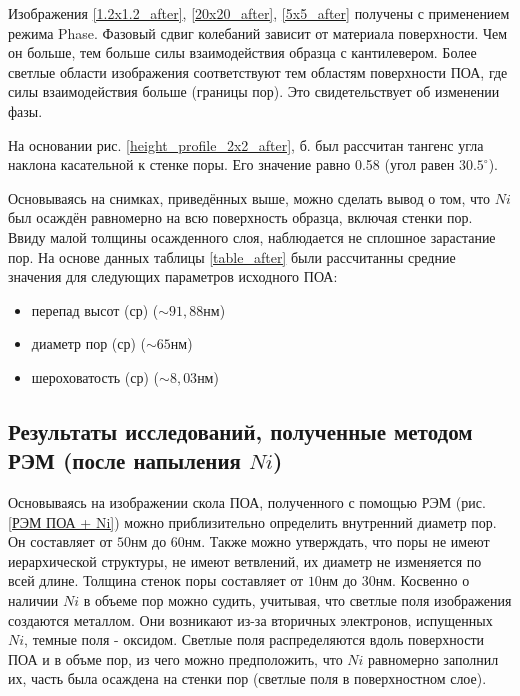 Изображения \ref{1.2x1.2_after}, \ref{20x20_after}, \ref{5x5_after} получены с применением режима Phase. Фазовый сдвиг колебаний зависит от материала поверхности. Чем он больше, тем больше силы взаимодействия образца с кантилевером. Более светлые области изображения соответствуют тем областям поверхности ПОА, где силы взаимодействия больше (границы пор). Это свидетельствует об изменении фазы.

На основании рис. \ref{height_profile_2x2_after}, б. был рассчитан тангенс угла наклона касательной к стенке поры. Его значение равно 0.58 (угол равен $30.5^{\circ}$).

Основываясь на снимках, приведённых выше, можно сделать вывод о том, что  $Ni$ был осаждён равномерно на всю поверхность образца, включая стенки пор. Ввиду малой толщины осажденного слоя, наблюдается не сплошное зарастание пор. На основе данных таблицы \ref{table_after} были рассчитанны средние значения для следующих параметров исходного ПОА:

\begin{itemize}
    \item перепад высот (ср) ($\sim 91,88 \text{нм}$)
    \item диаметр пор (ср) ($\sim 65\text{нм}$)
    \item шероховатость (ср) ($\sim 8,03\text{нм}$)
\end{itemize} 

\subsection{Результаты исследований, полученные методом РЭМ (после напыления $Ni$)}


Основываясь на изображении скола ПОА, полученного с помощью РЭМ (рис.\ref{РЭМ ПОА + Ni}) можно приблизительно определить внутренний диаметр пор. Он составляет от $50\text{нм}$ до $60\text{нм}$. Также можно утверждать, что поры не имеют иерархической структуры, не имеют ветвлений, их диаметр не изменяется по всей длине. Толщина стенок поры составляет от $10\text{нм}$ до $30\text{нм}$.
Косвенно о наличии $Ni$ в объеме пор можно судить, учитывая, что светлые поля изображения создаются металлом. Они возникают из-за вторичных электронов, испущенных $Ni$, темные поля - оксидом. Светлые поля распределяются вдоль поверхности ПОА и в объме пор, из чего можно предположить, что $Ni$ равномерно заполнил их, часть была осаждена на стенки пор (светлые поля в поверхностном слое).

